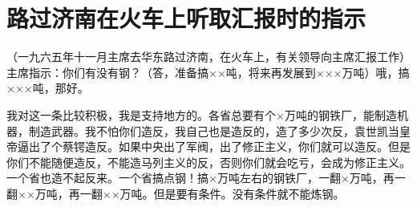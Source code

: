 \section[路过济南在火车上听取汇报时的指示（一九六五年十一月）]{路过济南在火车上听取汇报时的指示}


（一九六五年十一月主席去华东路过济南，在火车上，有关领导向主席汇报工作）主席指示：你们有没有钢？（答，准备搞××吨，将来再发展到×××万吨）哦，搞×××吨，那好。

我对这一条比较积极，我是支持地方的。各省总要有个×万吨的钢铁厂，能制造机器，制造武器。我不怕你们造反，我自己也是造反的，造了多少次反，袁世凯当皇帝逼出了个蔡锷造反。如果中央出了军阀，出了修正主义，你们就可以造反。但是你们不能随便造反，不能造马列主义的反，否则你们就会吃亏，会成为修正主义。一个省也造不起反来。一个省搞点钢！搞×万吨左右的钢铁厂，一翻×万吨，再一翻××万吨，再一翻××万吨。但是要有条件。没有条件就不能炼钢。


